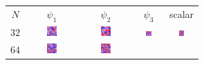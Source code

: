 \documentclass{article}
\begin{document}
\newpage


\begin{figure}[ht]
\begin{tabular}{cccc|c}
$N$ & $\psi_1$ & $\psi_2$ & $\psi_3$ & scalar\\
$32$ & 
\includegraphics[width=0.22\textwidth]{s42r32s20psi1_phase.png} &
\includegraphics[width=0.22\textwidth]{s42r32s20psi2_phase.png} &
\includegraphics[width=0.22\textwidth]{s42r32s20psi3_phase.png} &
\includegraphics[width=0.22\textwidth]{s42r32s20psi1_phase_scalar.png} \\
$64$ & 
\includegraphics[width=0.22\textwidth]{s42r64s20psi1_phase.png} &
\includegraphics[width=0.22\textwidth]{s42r64s20psi2_phase.png} &

\end{tabular}
\end{figure}
\end{document}
